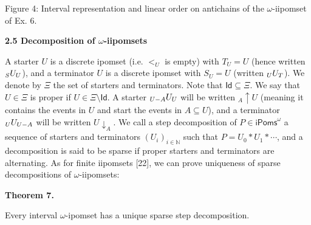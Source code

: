 \documentclass[10pt,a4paper]{article}
\begin{document}
\begin{center}\end{center}
   
Figure 4: Interval representation and linear order on antichains of the $\omega$-iipomset of Ex. 6.\par
 
 
 
 
\par\medskip\noindent\textbf{2.5 Decomposition of $\omega$-iipomsets}\par
 
 
A starter $U$ is a discrete ipomset (i.e. $<_{U}$ is empty) with $T_{U}=U$ (hence written ${\vphantom{U}}_{S}U_{U}$), and a terminator $U$ is a discrete ipomset with $S_{U}=U$ (written ${\vphantom{U}}_{U}U_{T}$). We denote by $\Xi$ the set of starters and terminators. Note that $\mathsf{Id}\subseteq\Xi$. We say that $U\in\Xi$ is proper if $U\in\Xi\setminus\mathsf{Id}$. A starter ${\vphantom{U}}_{U-A}U_{U}$ will be written ${}_{A\!}{\uparrow}{U}$ (meaning it contains the events in $U$ and start the events in $A\subseteq U$), and a terminator ${\vphantom{U}}_{U}U_{U-A}$ will be written ${U}{\downarrow}_{A}$. We call a step decomposition of $P\in{\mathsf{iPoms}^{\omega}}$ a sequence of starters and terminators $(U_{i})_{i\in\mathbb{N}}$ such that $P=U_{0}*U_{1}*\cdots$, and a decomposition is said to be sparse if proper starters and terminators are alternating. As for finite iipomsets [22], we can prove uniqueness of sparse decompositions of $\omega$-iipomsets:\par
 
 

 
\par\medskip\noindent\textbf{Theorem 7.}\par
 
 
Every interval $\omega$-ipomset has a unique sparse step decomposition.\par
 
\end{document}
